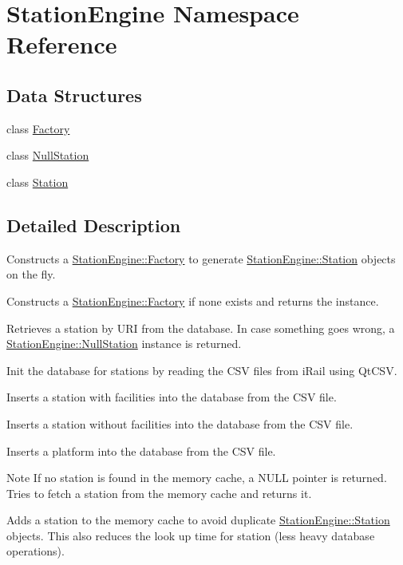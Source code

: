 \hypertarget{namespaceStationEngine}{}\section{Station\+Engine Namespace Reference}
\label{namespaceStationEngine}
\subsection*{Data Structures}
\begin{DoxyCompactItemize}
\item 
class \mbox{\hyperlink{classStationEngine_1_1Factory}{Factory}}
\item 
class \mbox{\hyperlink{classStationEngine_1_1NullStation}{Null\+Station}}
\item 
class \mbox{\hyperlink{classStationEngine_1_1Station}{Station}}
\end{DoxyCompactItemize}


\subsection{Detailed Description}
Constructs a \mbox{\hyperlink{classStationEngine_1_1Factory}{Station\+Engine\+::\+Factory}} to generate \mbox{\hyperlink{classStationEngine_1_1Station}{Station\+Engine\+::\+Station}} objects on the fly.

Constructs a \mbox{\hyperlink{classStationEngine_1_1Factory}{Station\+Engine\+::\+Factory}} if none exists and returns the instance.

Retrieves a station by U\+RI from the database. In case something goes wrong, a \mbox{\hyperlink{classStationEngine_1_1NullStation}{Station\+Engine\+::\+Null\+Station}} instance is returned.

Init the database for stations by reading the C\+SV files from i\+Rail using Qt\+C\+SV.

Inserts a station with facilities into the database from the C\+SV file.

Inserts a station without facilities into the database from the C\+SV file.

Inserts a platform into the database from the C\+SV file.

\begin{DoxyNote}{Note}
If no station is found in the memory cache, a N\+U\+LL pointer is returned. Tries to fetch a station from the memory cache and returns it.
\end{DoxyNote}
Adds a station to the memory cache to avoid duplicate \mbox{\hyperlink{classStationEngine_1_1Station}{Station\+Engine\+::\+Station}} objects. This also reduces the look up time for station (less heavy database operations).

